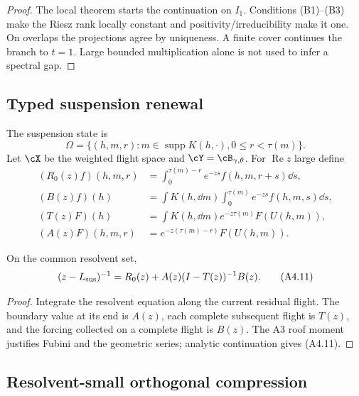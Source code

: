 \begin{proof}
The local theorem starts the continuation on $I_1$.  Conditions (B1)--(B3)
make the Riesz rank locally constant and positivity/irreducibility make it one.
On overlaps the projections agree by uniqueness.  A finite cover continues
the branch to $t=1$.  Large bounded multiplication alone is not used to infer
a spectral gap.
\end{proof}

\subsection{Typed suspension renewal}

The suspension state is
\[
 \Omega=\{(h,m,r):m\in\operatorname{supp}K(h,\cdot),
                       0\le r<\tau(m)\}.                  \tag{A4.6}
\]
Let $\cX$ be the weighted flight space and
$\cY=\cB_{\gamma,\theta}$.  For $\operatorname{Re}z$ large define
\begin{align}
 (R_0(z)f)(h,m,r)
 &=\int_0^{\tau(m)-r}e^{-zs}f(h,m,r+s)\dd s,              \tag{A4.7}\\
 (B(z)f)(h)
 &=\int K(h,\dd m)\int_0^{\tau(m)}e^{-zs}f(h,m,s)\dd s,  \tag{A4.8}\\
 (T(z)F)(h)
 &=\int K(h,\dd m)e^{-z\tau(m)}F(U(h,m)),                \tag{A4.9}\\
 (A(z)F)(h,m,r)
 &=e^{-z(\tau(m)-r)}F(U(h,m)).                            \tag{A4.10}
\end{align}

\begin{proposition}
\label{prop:r31-a4-renewal}
On the common resolvent set,
\[
 (z-L_{\rm sus})^{-1}
 =R_0(z)+A(z)(I-T(z))^{-1}B(z).                           \tag{A4.11}
\]
\end{proposition}

\begin{proof}
Integrate the resolvent equation along the current residual flight.  The
boundary value at its end is $A(z)$, each complete subsequent flight is
$T(z)$, and the forcing collected on a complete flight is $B(z)$.  The A3
roof moment justifies Fubini and the geometric series; analytic continuation
gives (A4.11).
\end{proof}

\subsection{Resolvent-small orthogonal compression}

